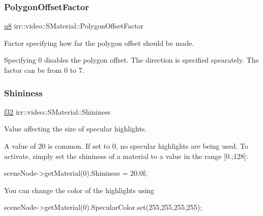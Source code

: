 \subsubsection{\texorpdfstring{Polygon\+Offset\+Factor}{PolygonOffsetFactor}}
{\footnotesize\ttfamily \hyperlink{namespaceirr_a646874f69af8ff87fc10201b0254a761}{u8} irr\+::video\+::\+S\+Material\+::\+Polygon\+Offset\+Factor}



Factor specifying how far the polygon offset should be made. 

Specifying 0 disables the polygon offset. The direction is specified spearately. The factor can be from 0 to 7. \mbox{\label{classirr_1_1video_1_1SMaterial_a877106a83108db6d1f30a38379d28494}} 
\subsubsection{\texorpdfstring{Shininess}{Shininess}}
{\footnotesize\ttfamily \hyperlink{namespaceirr_a0277be98d67dc26ff93b1a6a1d086b07}{f32} irr\+::video\+::\+S\+Material\+::\+Shininess}



Value affecting the size of specular highlights. 

A value of 20 is common. If set to 0, no specular highlights are being used. To activate, simply set the shininess of a material to a value in the range \mbox{[}0.;128\mbox{]}\+: 
\begin{DoxyCode}
sceneNode->getMaterial(0).Shininess = 20.0f;
\end{DoxyCode}


You can change the color of the highlights using 
\begin{DoxyCode}
sceneNode->getMaterial(0).SpecularColor.set(255,255,255,255);
\end{DoxyCode}


